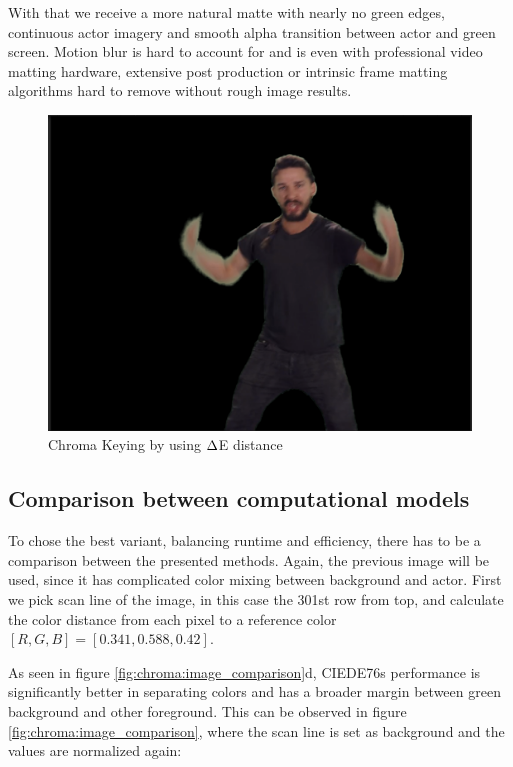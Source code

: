 
With that we receive a more natural matte with nearly no green edges, 
continuous actor imagery and smooth alpha transition between actor and green 
screen. Motion blur is hard to account for and is even with professional video 
matting hardware, extensive post production or intrinsic frame matting 
algorithms hard to remove without rough image results.

\begin{figure}[htb]
	\includegraphics[width=\textwidth]{_raw_resources/Comparison_DeltaE_color.png}
	\caption{Chroma Keying by using $\protect\Delta $E distance}
	\label{fig:chroma:deltae}
\end{figure}

\subsection{Comparison between computational models}

To chose the best variant, balancing runtime and efficiency, there has to be a 
comparison between the presented methods. Again, the previous image will be 
used, since it has complicated color mixing between background and actor. First 
we pick scan line of the image, in this case the 301st row from top, and 
calculate the color distance from each pixel to a reference color $[R, G, B] = 
[0.341, 0.588, 0.42]$.

As seen in figure \ref{fig:chroma:image_comparison}d, CIEDE76s performance is 
significantly better in separating colors and has a broader margin between 
green background and other foreground. This can be observed in figure 
\ref{fig:chroma:image_comparison}, where the scan line is set as background and 
the values are normalized again:

